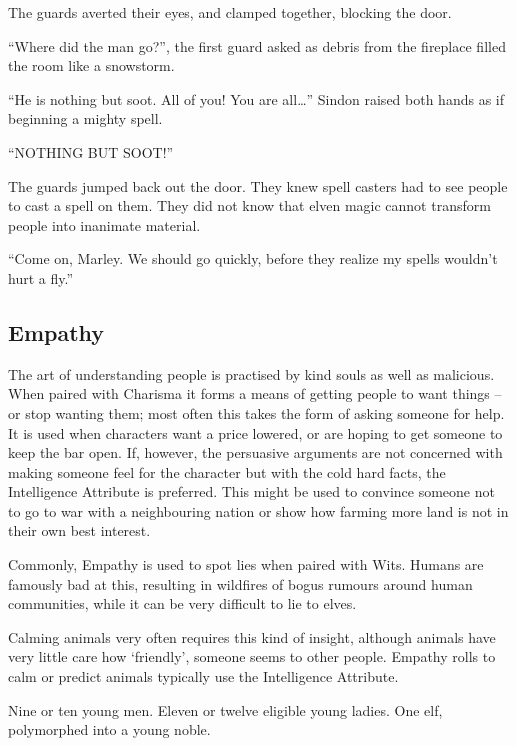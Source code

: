 \begin{multicols}{2}
\begin{exampletext}
  The guards averted their eyes, and clamped together, blocking the door.
  
  ``Where did the man go?'', the first guard asked as debris from the fireplace filled the room like a snowstorm.

  ``He is nothing but soot.
  All of you!
  You are all\ldots''
  Sindon raised both hands as if beginning a mighty spell.

  ``NOTHING BUT SOOT!''

  The guards jumped back out the door.
  They knew spell casters had to see people to cast a spell on them.
  They did not know that elven magic cannot transform people into inanimate material.

  ``Come on, Marley.
  We should go quickly, before they realize my spells wouldn't hurt a fly.''

\end{exampletext}

\subsection{Empathy}

The art of understanding people is practised by kind souls as well as malicious.
When paired with Charisma it forms a means of getting people to want things -- or stop wanting them; most often this takes the form of asking someone for help.
It is used when characters want a price lowered, or are hoping to get someone to keep the bar open.
If, however, the persuasive arguments are not concerned with making someone feel for the character but with the cold hard facts, the Intelligence Attribute is preferred.
This might be used to convince someone not to go to war with a neighbouring nation or show how farming more land is not in their own best interest.

Commonly, Empathy is used to spot lies when paired with Wits.
Humans are famously bad at this, resulting in wildfires of bogus rumours around human communities, while it can be very difficult to lie to elves.

Calming animals very often requires this kind of insight, although animals have very little care how `friendly', someone seems to other people.
Empathy rolls to calm or predict animals typically use the Intelligence Attribute.

\begin{exampletext}
  Nine or ten young men.
  Eleven or twelve eligible young ladies.
  One elf, polymorphed into a young noble.


\end{exampletext}
\end{multicols}
